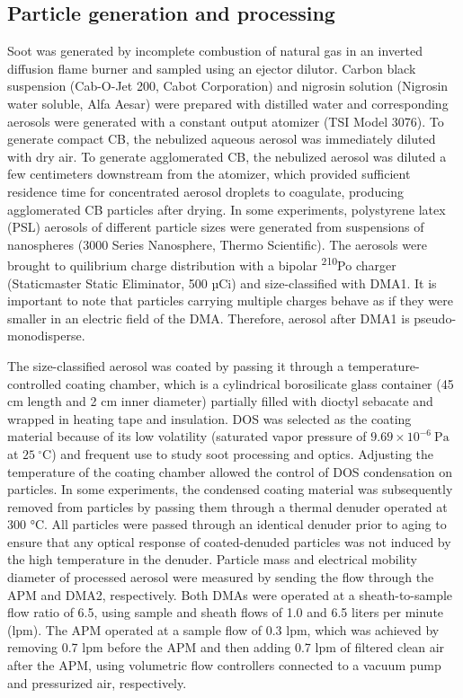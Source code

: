 \documentclass[12pt,authoryear]{elsarticle}
\begin{document}
\subsection{Particle generation and processing}

Soot was generated by incomplete combustion of natural gas in an inverted diffusion flame burner \citep{RN43,RN44} and sampled using an ejector dilutor. Carbon black suspension (Cab-O-Jet 200, Cabot Corporation) and nigrosin solution (Nigrosin water soluble, Alfa Aesar) were prepared with distilled water and corresponding aerosols were generated with a constant output atomizer (TSI Model 3076). To generate compact CB, the nebulized aqueous aerosol was immediately diluted with dry air. To generate agglomerated CB, the nebulized aerosol was diluted a few centimeters downstream from the atomizer, which provided sufficient residence time for concentrated aerosol droplets to coagulate, producing agglomerated CB particles after drying. In some experiments, polystyrene latex (PSL) aerosols of different particle sizes were generated from suspensions of nanospheres (3000 Series Nanosphere, Thermo Scientific). The aerosols were brought to quilibrium charge distribution with a bipolar \textsuperscript{210}Po charger (Staticmaster Static Eliminator, 500 µCi) and size-classified with DMA1. It is important to note that particles carrying multiple charges behave as if they were smaller in an electric field of the DMA. Therefore, aerosol after DMA1 is pseudo-monodisperse.

The size-classified aerosol was coated by passing it through a temperature-controlled coating chamber, which is a cylindrical borosilicate glass container (45 cm length and 2 cm inner diameter) partially filled with dioctyl sebacate and wrapped in heating tape and insulation. DOS was selected as the coating material because of its low volatility (saturated vapor pressure of $9.69\times10^{-6}\ \mathrm{Pa}$ at $25\ \mathrm{^{\circ}C}$) and frequent use to study soot processing and optics.
Adjusting the temperature of the coating chamber allowed the control of DOS condensation on particles. In some experiments, the condensed coating material was subsequently removed from particles by passing them through a thermal denuder operated at 300 °C. All particles were passed through an identical denuder prior to aging to ensure that any optical response of coated-denuded particles was not induced by the high temperature in the denuder. Particle mass and electrical mobility diameter of processed aerosol were measured by sending the flow through the APM and DMA2, respectively. Both DMAs were operated at a sheath-to-sample flow ratio of 6.5, using sample and sheath flows of 1.0 and 6.5 liters per minute (lpm). The APM operated at a sample flow of 0.3 lpm, which was achieved by removing 0.7 lpm before the APM and then adding 0.7 lpm of filtered clean air after the APM, using volumetric flow controllers connected to a vacuum pump and pressurized air, respectively.
\end{document}
